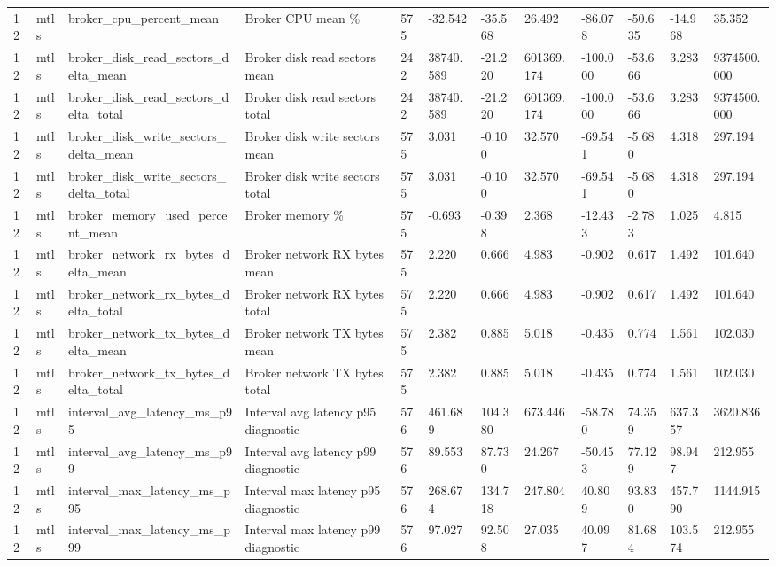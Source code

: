 \begin{longtable}{llllllllllll}
12 & mtls & broker\_cpu\_percent\_mean & Broker CPU mean \% & 575 & -32.542 & -35.568 & 26.492 & -86.078 & -50.635 & -14.968 & 35.352 \\
12 & mtls & broker\_disk\_read\_sectors\_delta\_mean & Broker disk read sectors mean & 242 & 38740.589 & -21.220 & 601369.174 & -100.000 & -53.666 & 3.283 & 9374500.000 \\
12 & mtls & broker\_disk\_read\_sectors\_delta\_total & Broker disk read sectors total & 242 & 38740.589 & -21.220 & 601369.174 & -100.000 & -53.666 & 3.283 & 9374500.000 \\
12 & mtls & broker\_disk\_write\_sectors\_delta\_mean & Broker disk write sectors mean & 575 & 3.031 & -0.100 & 32.570 & -69.541 & -5.680 & 4.318 & 297.194 \\
12 & mtls & broker\_disk\_write\_sectors\_delta\_total & Broker disk write sectors total & 575 & 3.031 & -0.100 & 32.570 & -69.541 & -5.680 & 4.318 & 297.194 \\
12 & mtls & broker\_memory\_used\_percent\_mean & Broker memory \% & 575 & -0.693 & -0.398 & 2.368 & -12.433 & -2.783 & 1.025 & 4.815 \\
12 & mtls & broker\_network\_rx\_bytes\_delta\_mean & Broker network RX bytes mean & 575 & 2.220 & 0.666 & 4.983 & -0.902 & 0.617 & 1.492 & 101.640 \\
12 & mtls & broker\_network\_rx\_bytes\_delta\_total & Broker network RX bytes total & 575 & 2.220 & 0.666 & 4.983 & -0.902 & 0.617 & 1.492 & 101.640 \\
12 & mtls & broker\_network\_tx\_bytes\_delta\_mean & Broker network TX bytes mean & 575 & 2.382 & 0.885 & 5.018 & -0.435 & 0.774 & 1.561 & 102.030 \\
12 & mtls & broker\_network\_tx\_bytes\_delta\_total & Broker network TX bytes total & 575 & 2.382 & 0.885 & 5.018 & -0.435 & 0.774 & 1.561 & 102.030 \\
12 & mtls & interval\_avg\_latency\_ms\_p95 & Interval avg latency p95 diagnostic & 576 & 461.689 & 104.380 & 673.446 & -58.780 & 74.359 & 637.357 & 3620.836 \\
12 & mtls & interval\_avg\_latency\_ms\_p99 & Interval avg latency p99 diagnostic & 576 & 89.553 & 87.730 & 24.267 & -50.453 & 77.129 & 98.947 & 212.955 \\
12 & mtls & interval\_max\_latency\_ms\_p95 & Interval max latency p95 diagnostic & 576 & 268.674 & 134.718 & 247.804 & 40.809 & 93.830 & 457.790 & 1144.915 \\
12 & mtls & interval\_max\_latency\_ms\_p99 & Interval max latency p99 diagnostic & 576 & 97.027 & 92.508 & 27.035 & 40.097 & 81.684 & 103.574 & 212.955 \\

\end{longtable}
